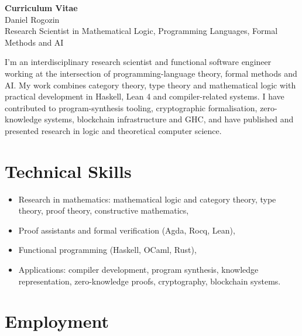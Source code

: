 \documentclass[10pt,a4paper]{article}
\begin{document}
\begin{center}
{\LARGE\textbf{Curriculum Vitae}}\\[0.3cm]
{\Large Daniel Rogozin} \\
{\Large Research Scientist in Mathematical Logic, Programming Languages, Formal Methods and AI}
\end{center}

\vspace{\baselineskip}
\vspace{\baselineskip}

I'm an interdisciplinary research scientist and functional software engineer working
at the intersection of programming-language theory, formal methods and AI.
My work combines category theory, type theory and mathematical
logic with practical development in Haskell, Lean 4 and compiler-related systems.
I have contributed to program-synthesis tooling, cryptographic formalisation, zero-knowledge systems,
blockchain infrastructure and GHC,
and have published and presented research in logic and theoretical computer science.

\section{Technical Skills}

\begin{itemize}
\item Research in mathematics: mathematical logic and category theory, type theory, proof theory, constructive mathematics,
\item Proof assistants and formal verification (Agda, Rocq, Lean),
\item Functional programming (Haskell, OCaml, Rust),
\item Applications: compiler development, program synthesis, knowledge representation, zero-knowledge proofs, cryptography, blockchain systems.
\end{itemize}

\section{Employment}
\end{document}

